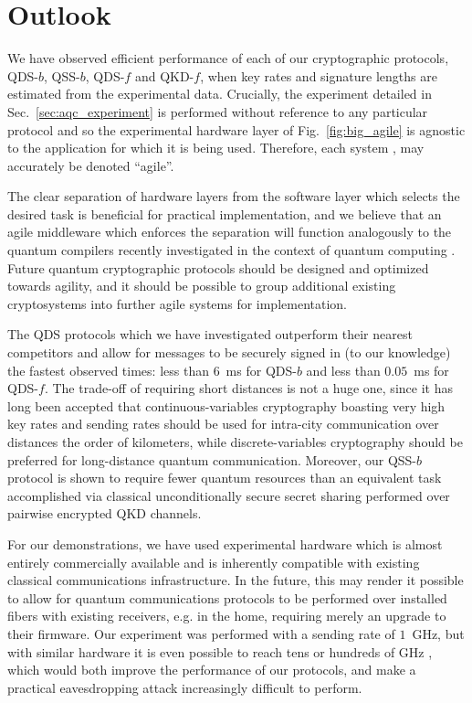 \section{Outlook}
We have observed efficient performance of each of our cryptographic protocols, QDS-$b$, QSS-$b$, QDS-$f$ and QKD-$f$, when key rates and signature lengths are estimated from the experimental data. Crucially, the experiment detailed in Sec.~\ref{sec:aqc_experiment} is performed without reference to any particular protocol and so the experimental hardware layer of Fig.~\ref{fig:big_agile} is agnostic to the application for which it is being used. Therefore, each system \systemB, \systemF \; may accurately be denoted ``agile''.

The clear separation of hardware layers from the software layer which selects the desired task is beneficial for practical implementation, and we believe that an agile middleware which enforces the separation will function analogously to the quantum compilers recently investigated in the context of quantum computing \cite{Killoran2018, qiskit, Murali2019}. Future quantum cryptographic protocols should be designed and optimized towards agility, and it should be possible to group additional existing cryptosystems into further agile systems for implementation.

The QDS protocols which we have investigated outperform their nearest competitors and allow for messages to be securely signed in (to our knowledge) the fastest observed times: less than $6$~ms for QDS-$b$ and less than $0.05$~ms for QDS-$f$. The trade-off of requiring short distances is not a huge one, since it has long been accepted \cite{Pirandola2015a} that continuous-variables cryptography boasting very high key rates and sending rates should be used for intra-city communication over distances the order of kilometers, while discrete-variables cryptography should be preferred for long-distance quantum communication. Moreover, our QSS-$b$ protocol is shown to require fewer quantum resources than an equivalent task accomplished via classical unconditionally secure secret sharing performed over pairwise encrypted QKD channels.

For our demonstrations, we have used experimental hardware which is almost entirely commercially available and is inherently compatible with existing classical communications infrastructure. In the future, this may render it possible to allow for quantum communications protocols to be performed over installed fibers with existing receivers, e.g. in the home, requiring merely an upgrade to their firmware. Our experiment was performed with a sending rate of $1$~GHz, but with similar hardware it is even possible to reach tens or hundreds of GHz \cite{Khan2015, Khan2016}, which would both improve the performance of our protocols, and make a practical eavesdropping attack increasingly difficult to perform. 

